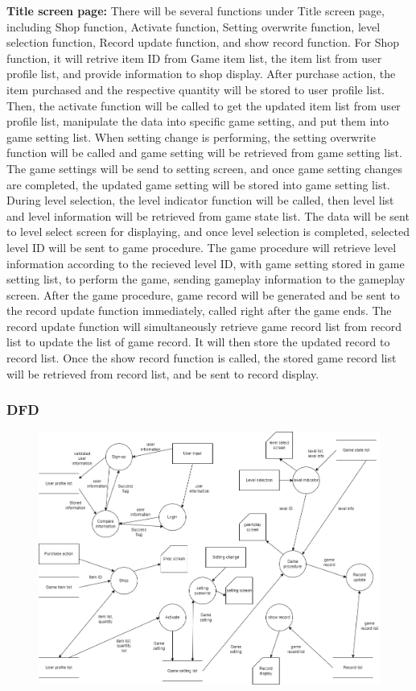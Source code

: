 \documentclass{article}
\begin{document}
\textbf{Title screen page:} There will be several functions under Title screen page, including Shop function, Activate function, Setting overwrite function, level selection function, Record update function, and show record function. For Shop function, it will retrive item ID from Game item list, the item list from user profile list, and provide information to shop display. After purchase action, the item purchased and the respective quantity will be stored to user profile list. Then, the activate function will be called to get the updated item list from user profile list, manipulate the data into specific game setting, and put them into game setting list. When setting change is performing, the setting overwrite function will be called and game setting will be retrieved from game setting list. The game settings will be send to setting screen, and once game setting changes are completed, the updated game setting will be stored into game setting list. During level selection, the level indicator function will be called, then level list and level information will be retrieved from game state list. The data will be sent to level select screen for displaying, and once level selection is completed, selected level ID will be sent to game procedure. The game procedure will retrieve level information according to the recieved level ID, with game setting stored in game setting list, to perform the game, sending gameplay information to the gameplay screen. After the game procedure, game record will be generated and be sent to the record update function immediately, called right after the game ends. The record update function will simultaneously retrieve game record list from record list to update the list of game record. It will then store the updated record to record list. Once the show record function is called, the stored game record list will be retrieved from record list, and be sent to record display.
\subsubsection{DFD}
\begin{figure}[H]
    \centering
    \includegraphics*[scale=0.4]{gameflow_DFD.png}
\end{figure}
\end{document}
